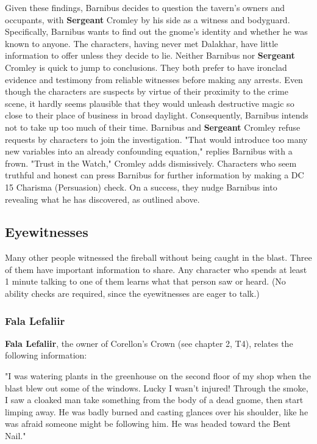 \documentclass[10pt,a4paper,twoside,twocolumn,openany,nodeprecatedcode]{dndbook}
\begin{document}
Given these findings, Barnibus decides to question the tavern's owners and occupants, with \textbf{Sergeant} Cromley by his side as a witness and bodyguard. Specifically, Barnibus wants to find out the gnome's identity and whether he was known to anyone. The characters, having never met Dalakhar, have little information to offer unless they decide to lie.
Neither Barnibus nor \textbf{Sergeant} Cromley is quick to jump to conclusions. They both prefer to have ironclad evidence and testimony from reliable witnesses before making any arrests. Even though the characters are suspects by virtue of their proximity to the crime scene, it hardly seems plausible that they would unleash destructive magic so close to their place of business in broad daylight. Consequently, Barnibus intends not to take up too much of their time.
Barnibus and \textbf{Sergeant} Cromley refuse requests by characters to join the investigation. "That would introduce too many new variables into an already confounding equation," replies Barnibus with a frown. "Trust in the Watch," Cromley adds dismissively. Characters who seem truthful and honest can press Barnibus for further information by making a DC 15 Charisma (Persuasion) check. On a success, they nudge Barnibus into revealing what he has discovered, as outlined above.
\subsection{Eyewitnesses}
Many other people witnessed the fireball without being caught in the blast. Three of them have important information to share. Any character who spends at least 1 minute talking to one of them learns what that person saw or heard. (No ability checks are required, since the eyewitnesses are eager to talk.)
\subsubsection{Fala Lefaliir}
\textbf{Fala Lefaliir}, the owner of Corellon's Crown (see chapter 2, T4), relates the following information:
\begin{DndReadAloud}{}
"I was watering plants in the greenhouse on the second floor of my shop when the blast blew out some of the windows. Lucky I wasn't injured! Through the smoke, I saw a cloaked man take something from the body of a dead gnome, then start limping away. He was badly burned and casting glances over his shoulder, like he was afraid someone might be following him. He was headed toward the Bent Nail."
\end{DndReadAloud}
\end{document}
